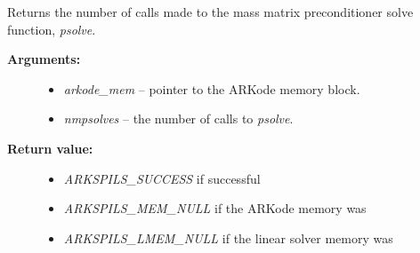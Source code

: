 \documentclass[letterpaper,10pt,english]{sphinxmanual}
\begin{document}
\begin{fulllineitems}
\label{c_interface/User_callable:c.ARKSpilsGetNumMassPrecSolves}
Returns the number of calls made to the mass matrix preconditioner
solve function, \emph{psolve}.
\begin{description}
\item[{\textbf{Arguments:}}] \leavevmode\begin{itemize}
\item {} 
\emph{arkode\_mem} -- pointer to the ARKode memory block.

\item {} 
\emph{nmpsolves} -- the number of calls to \emph{psolve}.

\end{itemize}

\item[{\textbf{Return value:}}] \leavevmode\begin{itemize}
\item {} 
\emph{ARKSPILS\_SUCCESS} if successful

\item {} 
\emph{ARKSPILS\_MEM\_NULL} if the ARKode memory was 

\item {} 
\emph{ARKSPILS\_LMEM\_NULL} if the linear solver memory was 

\end{itemize}

\end{description}

\end{fulllineitems}

\end{document}

